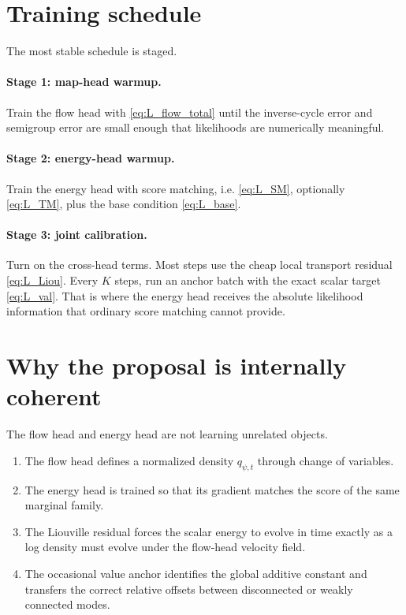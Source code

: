 \documentclass[11pt]{article}
\begin{document}
\section{Training schedule}

The most stable schedule is staged.

\paragraph{Stage 1: map-head warmup.}
Train the flow head with \eqref{eq:L_flow_total} until the inverse-cycle error and semigroup error are small enough that likelihoods are numerically meaningful.

\paragraph{Stage 2: energy-head warmup.}
Train the energy head with score matching, i.e. \eqref{eq:L_SM}, optionally \eqref{eq:L_TM}, plus the base condition \eqref{eq:L_base}.

\paragraph{Stage 3: joint calibration.}
Turn on the cross-head terms. Most steps use the cheap local transport residual \eqref{eq:L_Liou}. Every $K$ steps, run an anchor batch with the exact scalar target \eqref{eq:L_val}. That is where the energy head receives the absolute likelihood information that ordinary score matching cannot provide.

\section{Why the proposal is internally coherent}

The flow head and energy head are not learning unrelated objects.

\begin{enumerate}[label=(\arabic*),itemsep=0.25em,topsep=0.25em]
    \item The flow head defines a normalized density $q_{\psi,t}$ through change of variables.
    \item The energy head is trained so that its gradient matches the score of the same marginal family.
    \item The Liouville residual forces the scalar energy to evolve in time exactly as a log density must evolve under the flow-head velocity field.
    \item The occasional value anchor identifies the global additive constant and transfers the correct relative offsets between disconnected or weakly connected modes.
\end{enumerate}
\end{document}
